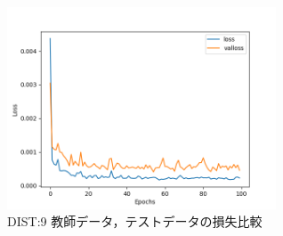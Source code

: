 \documentclass{jreport}		%
\begin{document}
\begin{figure}[htbp]
 \begin{center}
  \includegraphics[width=80mm]{gain10_loss_hikaku.png}
 \end{center}
 \caption{DIST:9 教師データ，テストデータの損失比較}
 \label{fig:one}
\end{figure}
\end{document}
